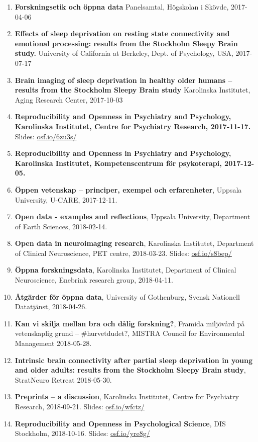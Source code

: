 \documentclass[10pt]{article}
\begin{document}
\begin{enumerate}[nolistsep]
\item \textbf{Forskningsetik och öppna data} Panelsamtal, Högskolan i Skövde, 2017-04-06
\item \textbf{Effects of sleep deprivation on resting state connectivity and emotional processing: results from the Stockholm Sleepy Brain study.} University of California at Berkeley, Dept. of Psychology, USA, 2017-07-17
\item \textbf{Brain imaging of sleep deprivation in healthy older humans – results from the Stockholm Sleepy Brain study} Karolinska Institutet, Aging Research Center, 2017-10-03
\item \textbf{Reproducibility and Openness in Psychiatry and Psychology, Karolinska Institutet, Centre for Psychiatry Research, 2017-11-17.} Slides: \href{https://osf.io/6zu3s/}{osf.io/6zu3s/}
\item \textbf{Reproducibility and Openness in Psychiatry and Psychology, Karolinska Institutet, Kompetenscentrum för psykoterapi, 2017-12-05.}
\item \textbf{Öppen vetenskap – principer, exempel och erfarenheter}, Uppsala University, U-CARE, 2017-12-11.
\item \textbf{Open data - examples and reflections}, Uppsala University, Department of Earth Sciences, 2018-02-14.
\item \textbf{Open data in neuroimaging research}, Karolinska Institutet, Department of Clinical Neuroscience, PET centre, 2018-03-23.
Slides: \href{https://osf.io/s8bep/}{osf.io/s8bep/}
\item \textbf{Öppna forskningsdata}, Karolinska Institutet, Department of Clinical Neuroscience, Enebrink research group, 2018-04-11.
\item \textbf{Åtgärder för öppna data}, University of Gothenburg, Svensk Nationell Datatjänst, 2018-04-26.
\item \textbf{Kan vi skilja mellan bra och dålig forskning?}, Framida miljövård på vetenskaplig grund – \#hurvetdudet?, MISTRA Council for Environmental Management 2018-05-28.
\item \textbf{Intrinsic brain connectivity after partial sleep deprivation in young and older adults: results from the Stockholm Sleepy Brain study}, StratNeuro Retreat 2018-05-30.
\item \textbf{Preprints – a discussion}, Karolinska Institutet, Centre for Psychiatry Research, 2018-09-21. Slides:
\href{https://osf.io/wfctz/}{osf.io/wfctz/}
\item \textbf{Reproducibility and Openness in Psychological Science}, DIS Stockholm, 2018-10-16. Slides: \href{https://osf.io/yre8g/}{osf.io/yre8g/}

\end{enumerate}
\end{document}
